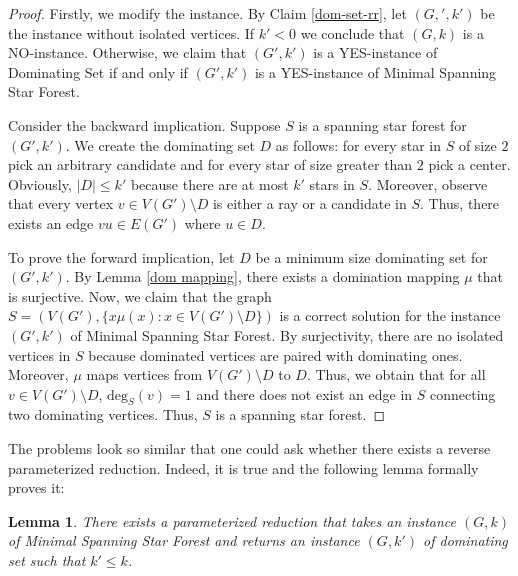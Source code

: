 \documentclass[en]{pracamgr}
\newtheorem{lemma}{Lemma}
\theoremstyle{definition}
\newcommand{\mssfp}{{\sc Minimal Spanning Star Forest}}
\newcommand{\domset}{dominating set}
\newcommand{\domsetp}{{\sc Dominating Set}}
\newcommand{\degree}[2]{\textrm{deg}_{#1}(#2)}
\begin{document}
\begin{proof}
	Firstly, we modify the instance. By Claim \ref{dom-set-rr}, let $(G,',k')$ be the instance without isolated vertices. If $k' < 0$ we conclude that $(G,k)$ is a NO-instance. Otherwise, we claim that $(G',k')$ is a YES-instance of \domsetp{} if and only if $(G',k')$ is a YES-instance of \mssfp{}. 
	
	Consider the backward implication. Suppose $S$ is a spanning star forest for $(G',k')$. We create the \domset{} $D$ as follows: for every star in $S$ of size $2$ pick an arbitrary candidate and for every star of size greater than $2$ pick a center. Obviously, $|D| \leq k'$ because there are at most $k'$ stars in $S$. Moreover, observe that every vertex $v \in V(G') \setminus D$ is either a ray or a candidate in $S$. Thus, there exists an edge $vu \in E(G')$ where $u \in D$.
	
	To prove the forward implication, let $D$ be a minimum size dominating set for $(G',k')$. By Lemma \ref{dom mapping}, there exists a domination mapping $\mu$ that is surjective. Now, we claim that the graph $S=(V(G'),\{x\mu(x): x \in V(G') \setminus D\})$ is a correct solution for the instance $(G',k')$ of \mssfp{}. By surjectivity, there are no isolated vertices in $S$ because dominated vertices are paired with dominating ones. Moreover, $\mu$ maps vertices from $V(G') \setminus D$ to $D$. Thus, we obtain that for all $v \in V(G') \setminus D$, $\degree{S}{v}=1$ and there does not exist an edge in $S$ connecting two dominating vertices. Thus, $S$ is a spanning star forest.
		
\end{proof}

The problems look so similar that one could ask whether there exists a reverse parameterized reduction. Indeed, it is true and the following lemma formally proves it:

\begin{lemma}\label{ssf-dom reduction}
	There exists a parameterized reduction that takes an instance $(G,k)$ of \mssfp{} and returns an instance $(G,k')$ of \domset{} such that $k' \leq k$. 
\end{lemma}
\end{document}
